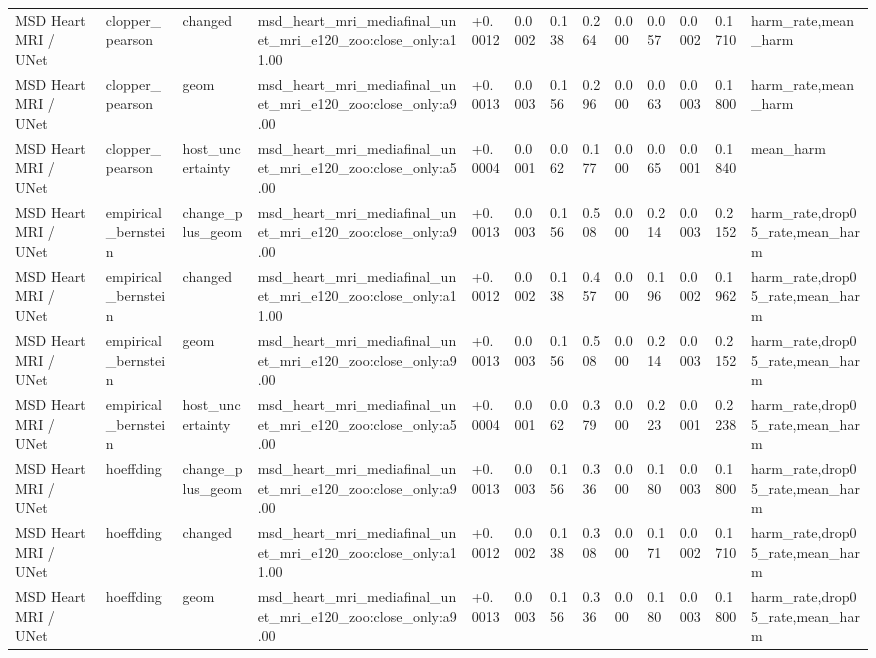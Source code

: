 \begin{table}[t]
\begin{tabular}{lllllllllllll}
MSD Heart MRI / UNet & clopper\_pearson & changed & msd\_heart\_mri\_mediafinal\_unet\_mri\_e120\_zoo:close\_only:a11.00 & +0.0012 & 0.0002 & 0.138 & 0.264 & 0.000 & 0.057 & 0.0002 & 0.1710 & harm\_rate,mean\_harm \\
MSD Heart MRI / UNet & clopper\_pearson & geom & msd\_heart\_mri\_mediafinal\_unet\_mri\_e120\_zoo:close\_only:a9.00 & +0.0013 & 0.0003 & 0.156 & 0.296 & 0.000 & 0.063 & 0.0003 & 0.1800 & harm\_rate,mean\_harm \\
MSD Heart MRI / UNet & clopper\_pearson & host\_uncertainty & msd\_heart\_mri\_mediafinal\_unet\_mri\_e120\_zoo:close\_only:a5.00 & +0.0004 & 0.0001 & 0.062 & 0.177 & 0.000 & 0.065 & 0.0001 & 0.1840 & mean\_harm \\
MSD Heart MRI / UNet & empirical\_bernstein & change\_plus\_geom & msd\_heart\_mri\_mediafinal\_unet\_mri\_e120\_zoo:close\_only:a9.00 & +0.0013 & 0.0003 & 0.156 & 0.508 & 0.000 & 0.214 & 0.0003 & 0.2152 & harm\_rate,drop05\_rate,mean\_harm \\
MSD Heart MRI / UNet & empirical\_bernstein & changed & msd\_heart\_mri\_mediafinal\_unet\_mri\_e120\_zoo:close\_only:a11.00 & +0.0012 & 0.0002 & 0.138 & 0.457 & 0.000 & 0.196 & 0.0002 & 0.1962 & harm\_rate,drop05\_rate,mean\_harm \\
MSD Heart MRI / UNet & empirical\_bernstein & geom & msd\_heart\_mri\_mediafinal\_unet\_mri\_e120\_zoo:close\_only:a9.00 & +0.0013 & 0.0003 & 0.156 & 0.508 & 0.000 & 0.214 & 0.0003 & 0.2152 & harm\_rate,drop05\_rate,mean\_harm \\
MSD Heart MRI / UNet & empirical\_bernstein & host\_uncertainty & msd\_heart\_mri\_mediafinal\_unet\_mri\_e120\_zoo:close\_only:a5.00 & +0.0004 & 0.0001 & 0.062 & 0.379 & 0.000 & 0.223 & 0.0001 & 0.2238 & harm\_rate,drop05\_rate,mean\_harm \\
MSD Heart MRI / UNet & hoeffding & change\_plus\_geom & msd\_heart\_mri\_mediafinal\_unet\_mri\_e120\_zoo:close\_only:a9.00 & +0.0013 & 0.0003 & 0.156 & 0.336 & 0.000 & 0.180 & 0.0003 & 0.1800 & harm\_rate,drop05\_rate,mean\_harm \\
MSD Heart MRI / UNet & hoeffding & changed & msd\_heart\_mri\_mediafinal\_unet\_mri\_e120\_zoo:close\_only:a11.00 & +0.0012 & 0.0002 & 0.138 & 0.308 & 0.000 & 0.171 & 0.0002 & 0.1710 & harm\_rate,drop05\_rate,mean\_harm \\
MSD Heart MRI / UNet & hoeffding & geom & msd\_heart\_mri\_mediafinal\_unet\_mri\_e120\_zoo:close\_only:a9.00 & +0.0013 & 0.0003 & 0.156 & 0.336 & 0.000 & 0.180 & 0.0003 & 0.1800 & harm\_rate,drop05\_rate,mean\_harm \\

\end{tabular}
\end{table}
